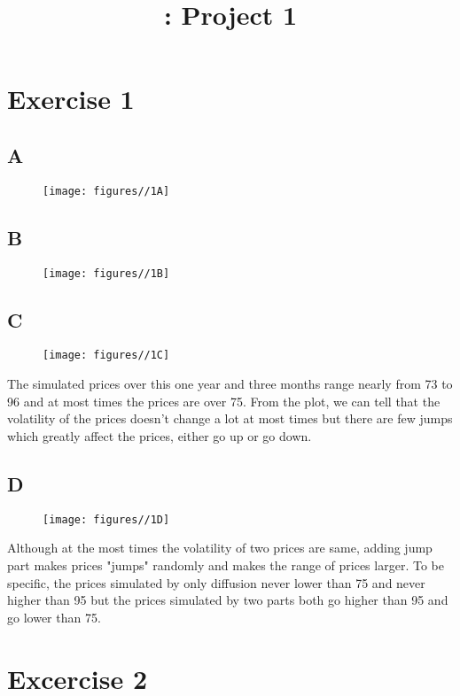 \documentclass{report}
\title{\LectureTitle: Project 1}
\begin{document}
\maketitle
\newpage

\section{ Exercise 1}
\subsection{A}
\begin{figure}[H]
        \centering 
         \texttt{[image: figures//1A]}
\end{figure}

\subsection{B}
\begin{figure}[H]
        \centering 
         \texttt{[image: figures//1B]}
\end{figure}

\subsection{C}
\begin{figure}[H]
        \centering 
         \texttt{[image: figures//1C]}
\end{figure}
The simulated prices over this one year and three months range nearly from 73 to 96 and at most times the prices are over 75. From the plot, we can tell that the volatility of the prices doesn't change a lot at most times but there are few jumps which greatly affect the prices, either go up or go down.
\subsection{D}
\begin{figure}[H]
        \centering 
         \texttt{[image: figures//1D]}
\end{figure}
Although at the most times the volatility of two prices are same, adding jump part makes prices "jumps" randomly and makes the range of prices larger. To be specific, the prices simulated by only diffusion never lower than 75 and never higher than 95 but the prices simulated by two parts both go higher than 95 and go lower than 75.
\section{ Excercise 2}
\end{document}
